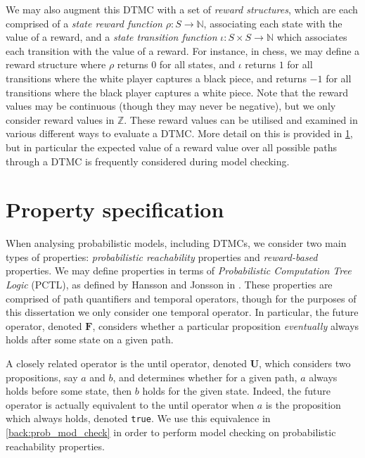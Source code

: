 We may also augment this DTMC with a set of \emph{reward structures}, which are each comprised of a \emph{state reward function} $\rho : S \rightarrow \mathbb{N}$, associating each state with the value of a reward, and a \emph{state transition function} $\iota : S \times S \rightarrow \mathbb{N}$ which associates each transition with the value of a reward. For instance, in chess, we may define a reward structure where $\rho$ returns $0$ for all states, and $\iota$ returns $1$ for all transitions where the white player captures a black piece, and returns $-1$ for all transitions where the black player captures a white piece. Note that the reward values may be continuous (though they may never be negative), but we only consider reward values in $\mathbb{Z}$. These reward values can be utilised and examined in various different ways to evaluate a DTMC. More detail on this is provided in \ref{back:prop_spec}, but in particular the expected value of a reward value over all possible paths through a DTMC is frequently considered during model checking.

\section{Property specification}
\label{back:prop_spec}

When analysing probabilistic models, including DTMCs, we consider two main types of properties: \emph{probabilistic reachability} properties and \emph{reward-based} properties. We may define properties in terms of \emph{Probabilistic Computation Tree Logic} (PCTL), as defined by Hansson and Jonsson in \cite{hansson_logic_1994}. These properties are comprised of path quantifiers and temporal operators, though for the purposes of this dissertation we only consider one temporal operator. In particular, the future operator, denoted $\mathbf{F}$, considers whether a particular proposition \emph{eventually} always holds after some state on a given path.

A closely related operator is the until operator, denoted  $\mathbf{U}$, which considers two propositions, say $a$ and $b$, and determines whether for a given path, $a$ always holds before some state, then $b$ holds for the given state. Indeed, the future operator is actually equivalent to the until operator when $a$ is the proposition which always holds, denoted \verb+true+. We use this equivalence in \ref{back:prob_mod_check} in order to perform model checking on probabilistic reachability properties.


